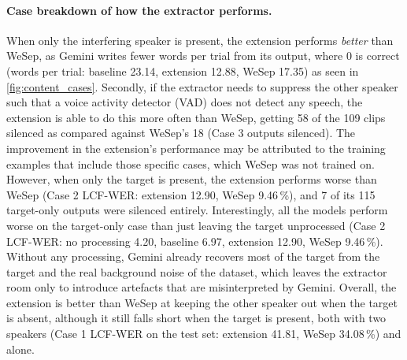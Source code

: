 \paragraph{Case breakdown of how the extractor performs.} When only the interfering speaker is present, the extension performs \emph{better} than WeSep, as Gemini writes fewer words per trial from its output, where 0 is correct (words per trial: baseline 23.14, extension 12.88, WeSep 17.35) as seen in \autoref{fig:content_cases}. Secondly, if the extractor needs to suppress the other speaker such that a voice activity detector (VAD) does not detect any speech, the extension is able to do this more often than WeSep, getting 58 of the 109 clips silenced as compared against WeSep's 18 (Case 3 outputs silenced). The improvement in the extension's performance may be attributed to the training examples that include those specific cases, which WeSep was not trained on. However, when only the target is present, the extension performs worse than WeSep (Case 2 LCF-WER: extension 12.90, WeSep 9.46\,\%), and 7 of its 115 target-only outputs were silenced entirely. Interestingly, all the models perform worse on the target-only case than just leaving the target unprocessed (Case 2 LCF-WER: no processing 4.20, baseline 6.97, extension 12.90, WeSep 9.46\,\%). Without any processing, Gemini already recovers most of the target from the target and the real background noise of the dataset, which leaves the extractor room only to introduce artefacts that are misinterpreted by Gemini. Overall, the extension is better than WeSep at keeping the other speaker out when the target is absent, although it still falls short when the target is present, both with two speakers (Case 1 LCF-WER on the test set: extension 41.81, WeSep 34.08\,\%) and alone.


\FloatBarrier
